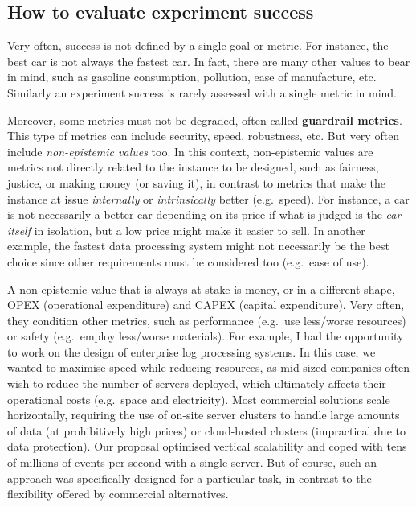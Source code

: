 \documentclass[
]{book}
\begin{document}
\hypertarget{how-to-evaluate-experiment-success}{%
\subsection{How to evaluate experiment success}\label{how-to-evaluate-experiment-success}}

Very often, success is not defined by a single goal or metric. For instance, the best car is not always the fastest car. In fact, there are many other values to bear in mind, such as gasoline consumption, pollution, ease of manufacture, etc. Similarly an experiment success is rarely assessed with a single metric in mind.

Moreover, some metrics must not be degraded, often called \textbf{guardrail metrics}. This type of metrics can include security, speed, robustness, etc. But very often include \emph{non-epistemic values} too. In this context, non-epistemic values are metrics not directly related to the instance to be designed, such as fairness, justice, or making money (or saving it), in contrast to metrics that make the instance at issue \emph{internally} or \emph{intrinsically} better (e.g.~speed). For instance, a car is not necessarily a better car depending on its price if what is judged is the \emph{car itself} in isolation, but a low price might make it easier to sell. In another example, the fastest data processing system might not necessarily be the best choice since other requirements must be considered too (e.g.~ease of use).

A non-epistemic value that is always at stake is money, or in a different shape, OPEX (operational expenditure) and CAPEX (capital expenditure). Very often, they condition other metrics, such as performance (e.g.~use less/worse resources) or safety (e.g.~employ less/worse materials). For example, I had the opportunity to work on the design of enterprise log processing systems. In this case, we wanted to maximise speed while reducing resources, as mid-sized companies often wish to reduce the number of servers deployed, which ultimately affects their operational costs (e.g.~space and electricity). Most commercial solutions scale horizontally, requiring the use of on-site server clusters to handle large amounts of data (at prohibitively high prices) or cloud-hosted clusters (impractical due to data protection). Our proposal optimised vertical scalability and coped with tens of millions of events per second with a single server. But of course, such an approach was specifically designed for a particular task, in contrast to the flexibility offered by commercial alternatives.
\end{document}
